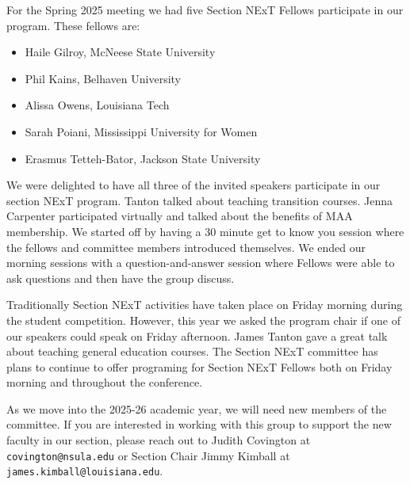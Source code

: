 \documentclass[10pt]{article} %
\begin{document}
\begin{minipage}[t]{.95\linewidth}
\begin{multicols}{2}
    For the Spring 2025 meeting we had five Section NExT Fellows participate in our program. These fellows are:

    \begin{itemize}
    \item
      Haile Gilroy, McNeese State University
    \item
      Phil Kains, Belhaven University
    \item
      Alissa Owens, Louisiana Tech
    \item
      Sarah Poiani, Mississippi University for Women
    \item
      Erasmus Tetteh-Bator, Jackson State University
    \end{itemize}

    We were delighted to have all three of the invited speakers participate in our section NExT program. Tanton talked about teaching transition courses. Jenna Carpenter participated virtually and talked about the benefits of MAA membership. We started off by having a 30 minute get to know you session where the fellows and committee members introduced themselves. We ended our morning sessions with a question-and-answer session where Fellows were able to ask questions and then have the group discuss.

    Traditionally Section NExT activities have taken place on Friday morning during the student competition. However, this year we asked the program chair if one of our speakers could speak on Friday afternoon. James Tanton gave a great talk about teaching general education courses. The Section NExT committee has plans to continue to offer programing for Section NExT Fellows both on Friday morning and throughout the conference.

    As we move into the 2025-26 academic year, we will need new members of the committee. If you are interested in working with this group to support the new faculty in our section, please reach out to Judith Covington at \texttt{covington@nsula.edu} or Section Chair Jimmy Kimball at \texttt{james.kimball@louisiana.edu}.

    \BackToContents %
  \end{multicols}
\end{minipage}
\end{document}
